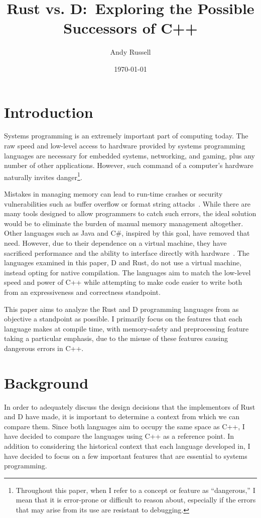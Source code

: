 \documentclass[finalcopy]{srpaper}
\title{Rust vs. D:\ Exploring the Possible Successors of C++}
\author{Andy Russell}
\date{\today}
\begin{document}
\frontmatter

\listoflistings{}

\chapter{Introduction}

Systems programming is an extremely important part of computing today. The raw
speed and low-level access to hardware provided by systems programming
languages are necessary for embedded systems, networking, and gaming, plus any
number of other applications. However, such command of a computer's hardware
naturally invites danger\footnote{Throughout this paper, when I refer to a
concept or feature as ``dangerous,'' I mean that it is error-prone or difficult
to reason about, especially if the errors that may arise from its use are
resistant to debugging.}.

Mistakes in managing memory can lead to run-time crashes or security
vulnerabilities such as buffer overflow or format string
attacks~\cite{Shahriar:2012:MPS:2187671.2187673}. While there are many tools
designed to allow programmers to catch such errors, the ideal solution would be
to eliminate the burden of manual memory management altogether. Other languages
such as Java and C\#, inspired by this goal, have removed that need. However,
due to their dependence on a virtual machine, they have sacrificed performance
and the ability to interface directly with
hardware~\cite{Alexandrescu:2010:DPL:1875434}. The languages examined in this
paper, D and Rust, do not use a virtual machine, instead opting for native
compilation. The languages aim to match the low-level speed and power of C++
while attempting to make code easier to write both from an expressiveness and
correctness standpoint.

This paper aims to analyze the Rust and D programming languages from as
objective a standpoint as possible. I primarily focus on the features that each
language makes at compile time, with memory-safety and preprocessing feature
taking a particular emphasis, due to the misuse of these features causing
dangerous errors in C++.

\chapter{Background}

In order to adequately discuss the design decisions that the implementors of
Rust and D have made, it is important to determine a context from which we can
compare them. Since both languages aim to occupy the same space as C++, I have
decided to compare the languages using C++ as a reference point. In addition
to considering the historical context that each language developed in, I have
decided to focus on a few important features that are essential to systems
programming.
\end{document}
